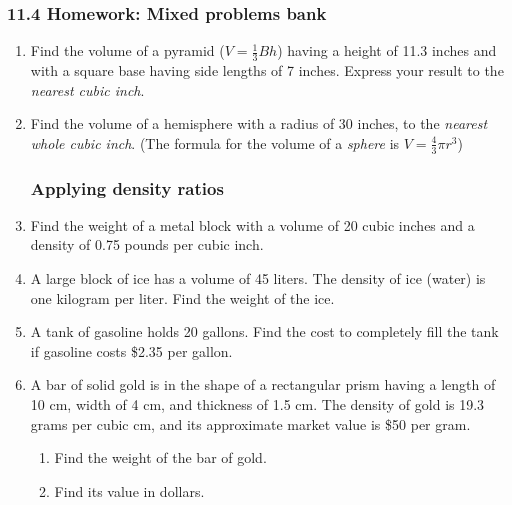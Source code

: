 

\fancyhead[LE]{\thepage}



\subsubsection*{11.4 Homework: Mixed problems bank}
\begin{enumerate}
\item Find the volume of a pyramid ($V=\frac{1}{3}Bh$) having a height of 11.3 inches and with a square base having side lengths of 7 inches. Express your result to the \emph{nearest cubic inch}. %

\item Find the volume of a hemisphere with a radius of 30 inches, to the \emph{nearest whole cubic inch}. (The formula for the volume of a \emph{sphere} is $V=\frac{4}{3}\pi r^3$) %

\subsubsection*{Applying density ratios}
\item Find the weight of a metal block with a volume of 20 cubic inches and a density of 0.75 pounds per cubic inch. %
\item A large block of ice has a volume of 45 liters. The density of ice (water) is one kilogram per liter. Find the weight of the ice.  %
\item A tank of gasoline holds 20 gallons. Find the cost to completely fill the tank if gasoline costs \$2.35 per gallon. %
\item A bar of solid gold is in the shape of a rectangular prism having a length of 10 cm, width of 4 cm, and thickness of 1.5 cm. The density of gold is 19.3 grams per cubic cm, and its approximate market value is \$50 per gram.
\begin{enumerate}
  \item Find the weight of the bar of gold.  %
  \item Find its value in dollars.
\end{enumerate}


\end{enumerate}

